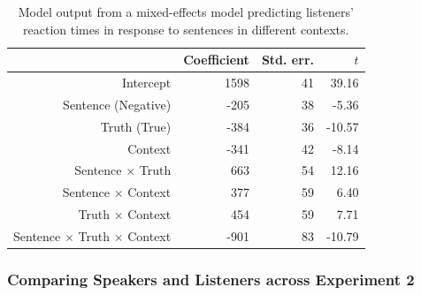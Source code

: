 \documentclass[man, floatsintext, noapacite]{apa6}
\begin{document}
\begin{table}
\caption{\label{tab:exp2_listenermodel} Model output from a mixed-effects model predicting listeners' reaction times in response to sentences in different contexts.}
\begin{center}
\begin{tabular}{rrrr}
  \hline
 & Coefficient & Std. err. & $t$ \\ 
  \hline
Intercept & 1598 & 41 & 39.16 \\ 
  Sentence (Negative) & -205 & 38 & -5.36  \\ 
  Truth (True) & -384 & 36 & -10.57 \\
  Context & -341 & 42 & -8.14 \\ 
  Sentence $\times$ Truth & 663 & 54 & 12.16 \\
  Sentence $\times$ Context & 377 & 59 & 6.40 \\
  Truth $\times$ Context & 454 & 59 & 7.71 \\
  Sentence $\times$ Truth $\times$ Context & -901 & 83 & -10.79 \\
   \hline
\end{tabular}
\end{center}
\end{table}


\subsubsection{Comparing Speakers and Listeners across Experiment 2}
\end{document}
